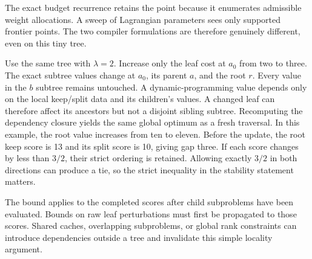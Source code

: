 The exact budget recurrence retains the point because it enumerates admissible weight allocations. A sweep of Lagrangian parameters sees only supported frontier points. The two compiler formulations are therefore genuinely different, even on this tiny tree.

Use the same tree with $\lambda=2$. Increase only the leaf cost at $a_0$ from two to three. The exact subtree values change at $a_0$, its parent $a$, and the root $r$. Every value in the $b$ subtree remains untouched.
A dynamic-programming value depends only on the local keep/split data and its children's values. A changed leaf can therefore affect its ancestors but not a disjoint sibling subtree. Recomputing the dependency closure yields the same global optimum as a fresh traversal. In this example, the root value increases from ten to eleven.
Before the update, the root keep score is 13 and its split score is 10, giving gap three. If each score changes by less than $3/2$, their strict ordering is retained. Allowing exactly $3/2$ in both directions can produce a tie, so the strict inequality in the stability statement matters.

The bound applies to the completed scores after child subproblems have been evaluated. Bounds on raw leaf perturbations must first be propagated to those scores. Shared caches, overlapping subproblems, or global rank constraints can introduce dependencies outside a tree and invalidate this simple locality argument.

